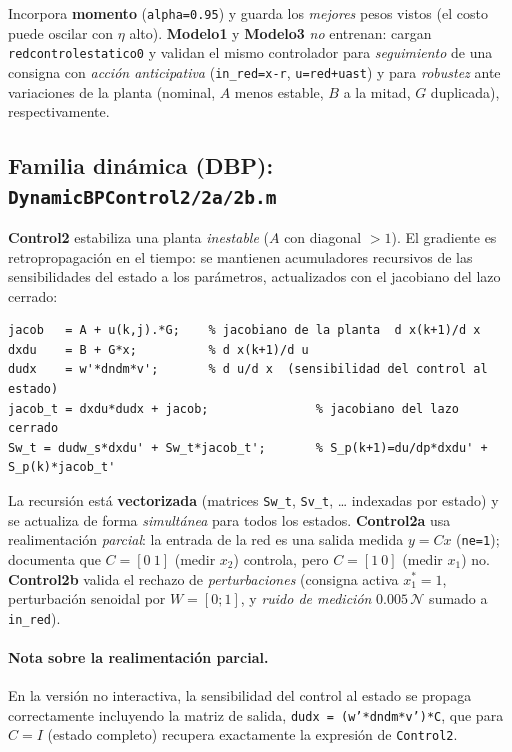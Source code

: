 \documentclass[11pt,a4paper]{article}
\newcommand{\code}[1]{\texttt{\small #1}}
\begin{document}
Incorpora \textbf{momento} (\code{alpha=0.95}) y guarda los \emph{mejores} pesos vistos
(el costo puede oscilar con $\eta$ alto). \textbf{Modelo1} y \textbf{Modelo3} \emph{no}
entrenan: cargan \code{redcontrolestatico0} y validan el mismo controlador para
\emph{seguimiento} de una consigna con \emph{acción anticipativa} (\code{in\_red=x-r},
\code{u=red+uast}) y para \emph{robustez} ante variaciones de la planta (nominal, $A$
menos estable, $B$ a la mitad, $G$ duplicada), respectivamente.

\subsection{Familia dinámica (DBP): \texttt{DynamicBPControl2/2a/2b.m}}
\textbf{Control2} estabiliza una planta \emph{inestable} ($A$ con diagonal $>1$). El
gradiente es retropropagación en el tiempo: se mantienen acumuladores recursivos de las
sensibilidades del estado a los parámetros, actualizados con el jacobiano del lazo
cerrado:

\begin{lstlisting}[caption={Recursión DBP vectorizada (jacobiano del lazo cerrado).}]
jacob   = A + u(k,j).*G;    % jacobiano de la planta  d x(k+1)/d x
dxdu    = B + G*x;          % d x(k+1)/d u
dudx    = w'*dndm*v';       % d u/d x  (sensibilidad del control al estado)
jacob_t = dxdu*dudx + jacob;               % jacobiano del lazo cerrado
Sw_t = dudw_s*dxdu' + Sw_t*jacob_t';       % S_p(k+1)=du/dp*dxdu' + S_p(k)*jacob_t'
\end{lstlisting}

La recursión está \textbf{vectorizada} (matrices \code{Sw\_t}, \code{Sv\_t}, \dots
indexadas por estado) y se actualiza de forma \emph{simultánea} para todos los estados.
\textbf{Control2a} usa realimentación \emph{parcial}: la entrada de la red es una salida
medida $y=Cx$ (\code{ne=1}); documenta que $C=[0\ 1]$ (medir $x_2$) controla, pero
$C=[1\ 0]$ (medir $x_1$) no. \textbf{Control2b} valida el rechazo de \emph{perturbaciones}
(consigna activa $x^*_1=1$, perturbación senoidal por $W=[0;1]$, y \emph{ruido de
medición} $0.005\,\mathcal{N}$ sumado a \code{in\_red}).

\paragraph{Nota sobre la realimentación parcial.} En la versión no interactiva, la sensibilidad
del control al estado se propaga correctamente incluyendo la matriz de salida,
\code{dudx = (w'*dndm*v')*C}, que para $C=I$ (estado completo) recupera exactamente la
expresión de \code{Control2}.
\end{document}
